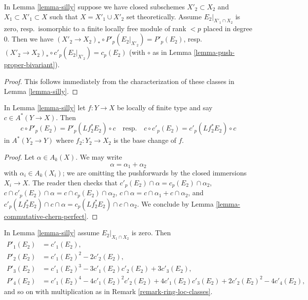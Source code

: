 \begin{lemma}
\label{lemma-silly-shrink}
In Lemma \ref{lemma-silly} suppose we have closed subschemes
$X'_2 \subset X_2$ and $X_1 \subset X'_1 \subset X$ such that
$X = X'_1 \cup X'_2$ set theoretically. Assume $E_2|_{X'_1 \cap X_2}$
is zero, resp.\ isomorphic to a finite locally free module
of rank $< p$ placed in degree $0$. Then we have
$(X'_2 \to X_2)_* \circ P'_p(E_2|_{X'_2}) = P'_p(E_2)$,
resp.\  $(X'_2 \to X_2)_* \circ c'_p(E_2|_{X'_2}) = c_p(E_2)$
(with $\circ$ as in Lemma \ref{lemma-push-proper-bivariant}).
\end{lemma}

\begin{proof}
This follows immediately from the characterization of these classes
in Lemma \ref{lemma-silly}.
\end{proof}

\begin{lemma}
\label{lemma-silly-commutes}
In Lemma \ref{lemma-silly} let $f : Y \to X$ be locally of finite type
and say $c \in A^*(Y \to X)$. Then
$$
c \circ P'_p(E_2) = P'_p(Lf_2^*E_2) \circ c
\quad\text{resp.}\quad
c \circ c'_p(E_2) = c'_p(Lf_2^*E_2) \circ c
$$
in $A^*(Y_2 \to Y)$ where $f_2 : Y_2 \to X_2$ is the base change of $f$.
\end{lemma}

\begin{proof}
Let $\alpha \in A_k(X)$. We may write
$$
\alpha = \alpha_1 + \alpha_2
$$
with $\alpha_i \in A_k(X_i)$; we are omitting the pushforwards
by the closed immersions $X_i \to X$. The reader then checks that
$c'_p(E_2) \cap \alpha = c_p(E_2) \cap \alpha_2$,
$c \cap c'_p(E_2) \cap \alpha = c \cap c_p(E_2) \cap \alpha_2$,
$c \cap \alpha = c \cap \alpha_1 + c \cap \alpha_2$, and
$c'_p(Lf_2^*E_2) \cap c \cap \alpha = c_p(Lf_2^*E_2) \cap c \cap \alpha_2$.
We conclude by Lemma \ref{lemma-commutative-chern-perfect}.
\end{proof}

\begin{lemma}
\label{lemma-silly-compose}
In Lemma \ref{lemma-silly} assume $E_2|_{X_1 \cap X_2}$ is zero. Then
\begin{align*}
P'_1(E_2) & = c'_1(E_2), \\
P'_2(E_2) & = c'_1(E_2)^2 - 2c'_2(E_2), \\
P'_3(E_2) & = c'_1(E_2)^3 - 3c'_1(E_2)c'_2(E_2) + 3c'_3(E_2), \\
P'_4(E_2) & = c'_1(E_2)^4 - 4c'_1(E_2)^2c'_2(E_2) +
4c'_1(E_2)c'_3(E_2) + 2c'_2(E_2)^2 - 4c'_4(E_2),
\end{align*}
and so on with multiplication as in Remark \ref{remark-ring-loc-classes}.
\end{lemma}

